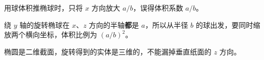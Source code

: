 \begin{trapbox}
\medskip
\begin{description}[style=nextline, leftmargin=2.8em, labelsep=0.5em, itemsep=0.35em]
    \item[\textbf{\textcolor{CTrap}{易错点五（球只伸缩一个方向）}}] 用球体积推椭球时，只将 $x$ 方向放大 $a/b$，误得体积系数 $a/b$。
    \item[\textbf{\textcolor{CTrap}{正确理解（三维伸缩）：}}] 绕 $y$ 轴的旋转椭球在 $x$、$z$ 方向的半轴\textbf{都}是 $a$，所以从半径 $b$ 的球出发，要同时缩放两个横向坐标，体积比例为 $(a/b)^2$。
    \item[\textbf{\textcolor{CTrap}{错因分析（只看二维母线）：}}] 椭圆是二维截面，旋转得到的实体是三维的，不能漏掉垂直纸面的 $z$ 方向。
\end{description}

\end{trapbox}
